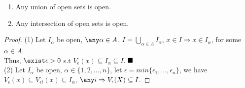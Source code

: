 \begin{theorem} \hspace{1em}
\begin{enumerate}
    \item Any union of open sets is open.
    \item Any  intersection of open sets is open.
\end{enumerate}
\end{theorem}
\begin{proof}
    (1) Let $I_\alpha$ be open, $\any \alpha \in A$, $I = \bigcup\limits_{\alpha \in A} I_\alpha$, $x \in I \Rightarrow x \in I_\alpha$, for some $\alpha \in A$. \\
    Thus, $\exist \epsilon >0$ s.t $V_\epsilon (x) \subseteq I_\alpha \subseteq I$. $\hfill\blacksquare$ \\
    (2) Let $I_\alpha$ be open, $\alpha \in \{1,2,...,n\}$, let $\epsilon = min\{ \epsilon_1,...,\epsilon_n\}$, we have $V_\epsilon (x) \subseteq V_{\epsilon i} (x)\subseteq I_\alpha$, $\any i \Rightarrow V_\epsilon (X) \subseteq I$.
\end{proof}


